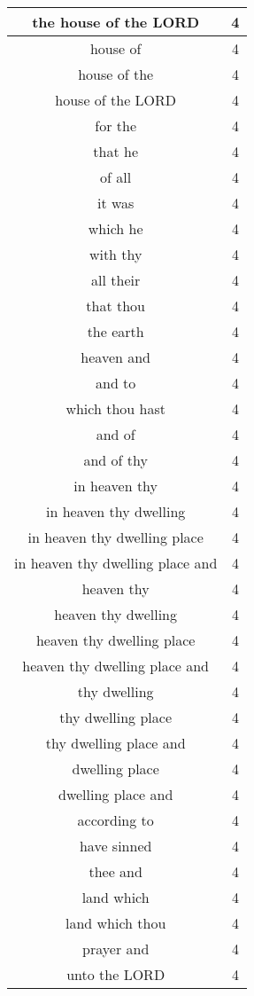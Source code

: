 \begin{center}
\begin{longtable}{|c|c|}
the house of the LORD & 4\\ \hline 
house of & 4\\ \hline 
house of the & 4\\ \hline 
house of the LORD & 4\\ \hline 
for the & 4\\ \hline 
that he & 4\\ \hline 
of all & 4\\ \hline 
it was & 4\\ \hline 
which he & 4\\ \hline 
with thy & 4\\ \hline 
all their & 4\\ \hline 
that thou & 4\\ \hline 
the earth & 4\\ \hline 
heaven and & 4\\ \hline 
and to & 4\\ \hline 
which thou hast & 4\\ \hline 
and of & 4\\ \hline 
and of thy & 4\\ \hline 
in heaven thy & 4\\ \hline 
in heaven thy dwelling & 4\\ \hline 
in heaven thy dwelling place & 4\\ \hline 
in heaven thy dwelling place and & 4\\ \hline 
heaven thy & 4\\ \hline 
heaven thy dwelling & 4\\ \hline 
heaven thy dwelling place & 4\\ \hline 
heaven thy dwelling place and & 4\\ \hline 
thy dwelling & 4\\ \hline 
thy dwelling place & 4\\ \hline 
thy dwelling place and & 4\\ \hline 
dwelling place & 4\\ \hline 
dwelling place and & 4\\ \hline 
according to & 4\\ \hline 
have sinned & 4\\ \hline 
thee and & 4\\ \hline 
land which & 4\\ \hline 
land which thou & 4\\ \hline 
prayer and & 4\\ \hline 
unto the LORD & 4\\ \hline 

\end{longtable}
\end{center}
